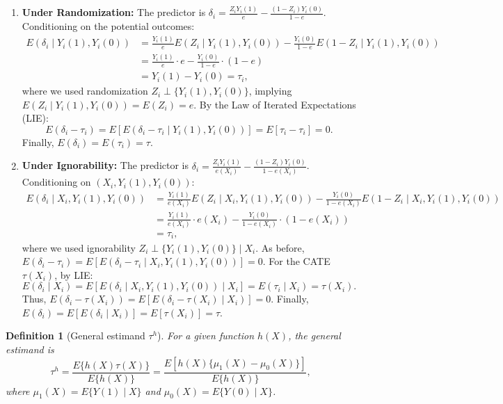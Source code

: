 \documentclass[krantz1]{krantz}
\newtheorem{definition}{Definition}
\def\ind{\perp}
\begin{document}
\begin{enumerate}
\item \textbf{Under Randomization:}
The predictor is $\delta_i = \frac{Z_i Y_i(1)}{e} - \frac{(1-Z_i) Y_i(0)}{1-e}$. Conditioning on the potential outcomes:
\begin{align*}
    E(\delta_i \mid Y_i(1), Y_i(0)) &= \frac{Y_i(1)}{e} E(Z_i \mid Y_i(1), Y_i(0)) - \frac{Y_i(0)}{1-e} E(1-Z_i \mid Y_i(1), Y_i(0)) \\
    &= \frac{Y_i(1)}{e} \cdot e - \frac{Y_i(0)}{1-e} \cdot (1-e) \\
    &= Y_i(1) - Y_i(0) = \tau_i,
\end{align*}
where we used randomization $Z_i \ind \{Y_i(1), Y_i(0)\}$, implying $E(Z_i \mid Y_i(1), Y_i(0)) = E(Z_i) = e$.
By the Law of Iterated Expectations (LIE):
\begin{equation*}
    E(\delta_i - \tau_i) = E[ E(\delta_i - \tau_i \mid Y_i(1), Y_i(0)) ] = E[\tau_i - \tau_i] = 0.
\end{equation*}
Finally, $E(\delta_i) = E(\tau_i) = \tau$.

\item \textbf{Under Ignorability:}
The predictor is $\delta_i = \frac{Z_i Y_i(1)}{e(X_i)} - \frac{(1-Z_i) Y_i(0)}{1-e(X_i)}$. Conditioning on $(X_i, Y_i(1), Y_i(0))$:
\begin{align*}
    E(\delta_i \mid X_i, Y_i(1), Y_i(0)) &= \frac{Y_i(1)}{e(X_i)} E(Z_i \mid X_i, Y_i(1), Y_i(0)) - \frac{Y_i(0)}{1-e(X_i)} E(1-Z_i \mid X_i, Y_i(1), Y_i(0)) \\
    &= \frac{Y_i(1)}{e(X_i)} \cdot e(X_i) - \frac{Y_i(0)}{1-e(X_i)} \cdot (1-e(X_i)) \\
    &= \tau_i,
\end{align*}
where we used ignorability $Z_i \ind \{Y_i(1), Y_i(0)\} \mid X_i$. 
As before, $E(\delta_i - \tau_i) = E[ E(\delta_i - \tau_i \mid X_i, Y_i(1), Y_i(0)) ] = 0$.
For the CATE $\tau(X_i)$, by LIE:
\begin{equation*}
    E(\delta_i \mid X_i) = E[ E(\delta_i \mid X_i, Y_i(1), Y_i(0)) \mid X_i ] = E(\tau_i \mid X_i) = \tau(X_i).
\end{equation*}
Thus, $E(\delta_i - \tau(X_i)) = E[ E(\delta_i - \tau(X_i) \mid X_i) ] = 0$.
Finally, $E(\delta_i) = E[E(\delta_i \mid X_i)] = E[\tau(X_i)] = \tau$.
\end{enumerate}


\begin{definition}[General estimand $\tau^h$]\label{13:def:tau-h}
For a given function $h(X)$, the general estimand is
$$
\tau^h = \frac{E\{h(X)\tau(X)\}}{E\{h(X)\}} = \frac{E[h(X)\{\mu_1(X) - \mu_0(X)\}]}{E\{h(X)\}},
$$
where $\mu_1(X) = E\{Y(1)\mid X\}$ and $\mu_0(X) = E\{Y(0)\mid X\}$.
\end{definition}
\end{document}
